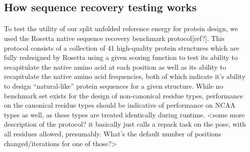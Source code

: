 \subsection{How sequence recovery testing works}
\paragraph{}
To test the utility of our split unfolded reference energy for protein design, we used the Rosetta native sequence recovery benchmark protocol[ref?].
This protocol consists of a collection of 41 high-quality protein structures which are fully redesigned by Rosetta using a given scoring function to test its ability to recapitulate the native amino acid at each position as well as its ability to recapitulate the native amino acid frequencies, both of which indicate it's ability to design ``natural-like'' protein sequences for a given structure.
While no benchmark set exists for the design of non-canonical residue types, performance on the canonical residue types should be indicative of performance on NCAA types as well, as these types are treated identically during runtime.
<some more description of the protocol? it basically just calls a repack task on the pose, with all residues allowed, presumably. What's the default number of positions changed/iterations for one of those?>
